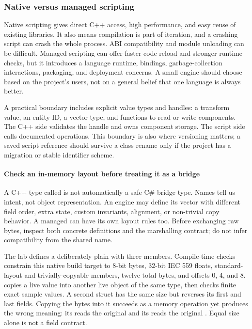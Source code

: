 \subsubsection{Native versus managed scripting}\label{06-engine-ii-ch040-native-versus-managed-scripting}

\hypertarget{06-engine-ii-ch040-native-versus-managed-scripting}{}

Native scripting gives direct C++ access, high performance, and easy reuse of existing libraries. It also means compilation is part of iteration, and a crashing script can crash the whole process. ABI compatibility and module unloading can be difficult. Managed scripting can offer faster code reload and stronger runtime checks, but it introduces a language runtime, bindings, garbage-collection interactions, packaging, and deployment concerns. A small engine should choose based on the project's users, not on a general belief that one language is always better.

A practical boundary includes explicit value types and handles: a transform value, an entity ID, a vector type, and functions to read or write components. The C++ side validates the handle and owns component storage. The script side calls documented operations. This boundary is also where versioning matters; a saved script reference should survive a class rename only if the project has a migration or stable identifier scheme.

\paragraph{Check an in-memory layout before treating it as a bridge}\label{06-engine-ii-ch040-check-an-in-memory-layout-before-treating-it-as-a-bridge}

\hypertarget{06-engine-ii-ch040-check-an-in-memory-layout-before-treating-it-as-a-bridge}{}

A C++ type called  is not automatically a safe C\# bridge type. Names tell us intent, not object representation. An engine may define its vector with different field order, extra state, custom invariants, alignment, or non-trivial copy behavior. A managed  can have its own layout rules too. Before exchanging raw bytes, inspect both concrete definitions and the marshalling contract; do not infer compatibility from the shared name.

The lab defines a deliberately plain  with three  members. Compile-time checks constrain this native build target to 8-bit bytes, 32-bit IEC 559 floats, standard-layout and trivially-copyable members, twelve total bytes, and offsets 0, 4, and 8.  copies a live value into another live object of the same type, then checks finite exact sample values. A second struct has the same size but reverses its first and last fields. Copying the bytes into it succeeds as a memory operation yet produces the wrong meaning: its  reads the original  and its  reads the original . Equal size alone is not a field contract.

